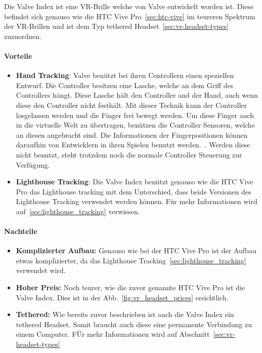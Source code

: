 Die Valve Index ist eine VR-Brille welche von Valve entwickelt worden ist.
Diese befindet sich genauso wie die HTC Vive Pro~\ref{sec:htc-vive} im teureren Spektrum~\cite{ALSOP_2019} der VR-Brillen und ist dem Typ tethered Headset~\ref{sec:vr-headset-types} zuzuordnen.

\paragraph{Vorteile}

\begin{itemize}
    \item \textbf{Hand Tracking}: Valve benützt bei ihren Controllern einen speziellen Entwurf.
    Die Controller besitzen eine Lasche, welche an dem Griff des Controllers hängt.
    Diese Lasche hält den Controller and der Hand, auch wenn diese den Controller nicht festhält.
    Mit dieser Technik kann der Controller losgelassen werden und die Finger frei bewegt werden.
    Um diese Finger auch in die virtuelle Welt zu übertragen, benützen die Controller Sensoren, welche an diesen angebracht sind.
    Die Informationen der Fingerpositionen können daraufhin von Entwicklern in ihren Spielen benutzt werden.~\cite{SadlyItsBradley_2019}.
    Werden diese nicht benutzt, steht trotzdem noch die normale Controller Steuerung zur Verfügung.
    \item \textbf{Lighthouse Tracking}: Die Valve Index benützt genauso wie die HTC Vive Pro das Lighthouse tracking mit dem Unterschied, dass beide Versionen des Lighthouse Tracking verwendet werden können.
    Für mehr Informationen wird auf~\ref{sec:lighthouse_tracking} verwiesen.
\end{itemize}

\paragraph{Nachteile}

\begin{itemize}
    \item \textbf{Komplizierter Aufbau:} Genauso wie bei der HTC Vive Pro ist der Aufbau etwas komplizierter, da das Lighthouse Tracking~\ref{sec:lighthouse_tracking} verwendet wird.
    \item \textbf{Hoher Preis:} Noch teurer, wie die zuvor genannte HTC Vive Pro ist die Valve Index.
    Dies ist in der Abb.~\ref{fig:vr_headset_prices} ersichtlich.
    \item \textbf{Tethered:} Wie bereits zuvor beschrieben ist auch die Valve Index ein tethered Headset.
    Somit braucht auch diese eine permanente Verbindung zu einem Computer.
    FÜr mehr Informationen wird auf Abschnitt~\ref{sec:vr-headset-types}
\end{itemize}

